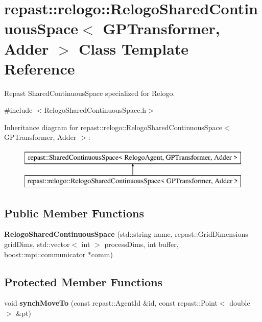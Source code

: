 \hypertarget{classrepast_1_1relogo_1_1_relogo_shared_continuous_space}{\section{repast\-:\-:relogo\-:\-:Relogo\-Shared\-Continuous\-Space$<$ G\-P\-Transformer, Adder $>$ Class Template Reference}
\label{classrepast_1_1relogo_1_1_relogo_shared_continuous_space}
}


Repast Shared\-Continuous\-Space specialized for Relogo.  




{\ttfamily \#include $<$Relogo\-Shared\-Continuous\-Space.\-h$>$}

Inheritance diagram for repast\-:\-:relogo\-:\-:Relogo\-Shared\-Continuous\-Space$<$ G\-P\-Transformer, Adder $>$\-:\begin{figure}[H]
\begin{center}
\leavevmode
\includegraphics[height=2.000000cm]{classrepast_1_1relogo_1_1_relogo_shared_continuous_space}
\end{center}
\end{figure}
\subsection*{Public Member Functions}
\begin{DoxyCompactItemize}
\item 
\hypertarget{classrepast_1_1relogo_1_1_relogo_shared_continuous_space_a320ffde7362f558b790376ab5765d273}{{\bfseries Relogo\-Shared\-Continuous\-Space} (std\-::string name, repast\-::\-Grid\-Dimensions grid\-Dims, std\-::vector$<$ int $>$ process\-Dims, int buffer, boost\-::mpi\-::communicator $\ast$comm)}\label{classrepast_1_1relogo_1_1_relogo_shared_continuous_space_a320ffde7362f558b790376ab5765d273}

\end{DoxyCompactItemize}
\subsection*{Protected Member Functions}
\begin{DoxyCompactItemize}
\item 
\hypertarget{classrepast_1_1relogo_1_1_relogo_shared_continuous_space_a0fae00be7a12e9080c9a945f2900f34f}{void {\bfseries synch\-Move\-To} (const repast\-::\-Agent\-Id \&id, const repast\-::\-Point$<$ double $>$ \&pt)}\label{classrepast_1_1relogo_1_1_relogo_shared_continuous_space_a0fae00be7a12e9080c9a945f2900f34f}

\end{DoxyCompactItemize}


